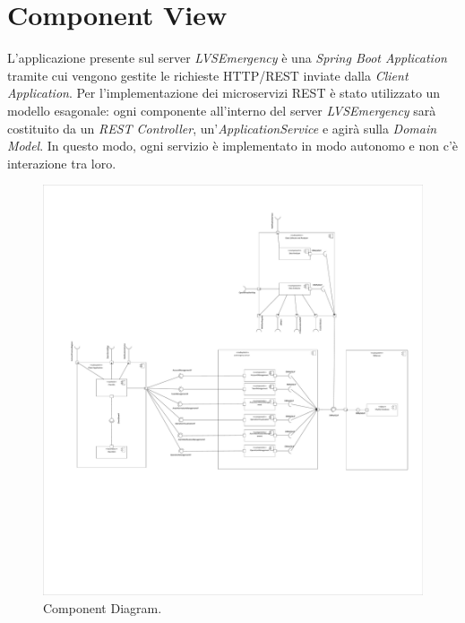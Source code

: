 \section{Component View}
L'applicazione presente sul server \textit{LVSEmergency} è una \textit{Spring Boot Application} tramite cui vengono gestite le richieste HTTP/REST inviate dalla \textit{Client Application}.
Per l'implementazione dei microservizi REST è stato utilizzato un modello esagonale: ogni componente all'interno del server \textit{LVSEmergency} sarà costituito da un \textit{REST Controller}, un'\textit{ApplicationService} e agirà sulla \textit{Domain Model}. In questo modo, ogni servizio è implementato in modo autonomo e non c'è interazione tra loro.

\begin{figure}[h!]
	\centering
	\includegraphics[width=1\linewidth]{./Iterazione 1/OtherFiles/UML - Component View}
	\caption{Component Diagram.}
	\label{fig:ComponentDiagram}
\end{figure}
